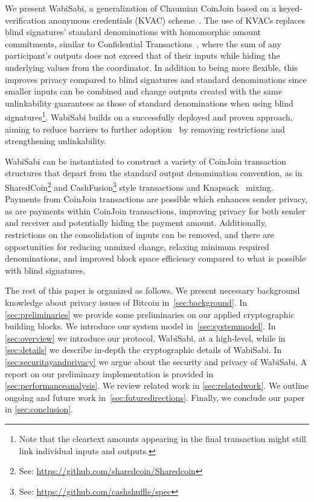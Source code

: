 \documentclass[a4paper]{article}
\begin{document}
We present WabiSabi, a generalization of Chaumian CoinJoin based on a keyed-verification anonymous credentials (KVAC) scheme~\cite{chase2019signal}. The use of KVACs replaces blind signatures' standard denominations with homomorphic amount commitments, similar to Confidential Transactions~\cite{maxwell2016confidential}, where the sum of any participant's outputs does not exceed that of their inputs while hiding the underlying values from the coordinator. In addition to being more flexible, this improves privacy compared to blind signatures and standard denominations since smaller inputs can be combined and change outputs created with the same unlinkability guarantees as those of standard denominations when using blind signatures\footnote{Note that the cleartext amounts appearing in the final transaction might still link individual inputs and outputs.}. WabiSabi builds on a successfully deployed and proven approach, aiming to reduce barriers to further adoption~\cite{dingledine2006anonymity} by removing restrictions and strengthening unlinkability.

WabiSabi can be instantiated to construct a variety of CoinJoin transaction structures that depart from the standard output denomination convention, as in SharedCoin\footnote{See: \url{https://github.com/sharedcoin/Sharedcoin}} and CashFusion\footnote{See: \url{https://github.com/cashshuffle/spec}} style transactions and Knapsack~\cite{maurer2017anonymous} mixing. Payments from CoinJoin transactions are possible which enhances sender privacy, as are payments within CoinJoin transactions, improving privacy for both sender and receiver and potentially hiding the payment amount. Additionally, restrictions on the consolidation of inputs can be removed, and there are opportunities for reducing unmixed change, relaxing minimum required denominations, and improved block space efficiency compared to what is possible with blind signatures.

The rest of this paper is organized as follows. We present necessary background knowledge about privacy issues of Bitcoin in~\cref{sec:background}. In \cref{sec:preliminaries} we provide some preliminaries on our applied cryptographic building blocks. We introduce our system model in~\cref{sec:systemmodel}. In \cref{sec:overview} we introduce our protocol, WabiSabi, at a high-level, while in \cref{sec:details} we describe in-depth the cryptographic details of WabiSabi. In \cref{sec:securitayandprivacy} we argue about the security and privacy of WabiSabi. A report on our preliminary implementation is provided in \cref{sec:performanceanalysis}. We review related work in \cref{sec:relatedwork}. We outline ongoing and future work in~\cref{sec:futuredirections}. Finally, we conclude our paper in \cref{sec:conclusion}.
\end{document}
